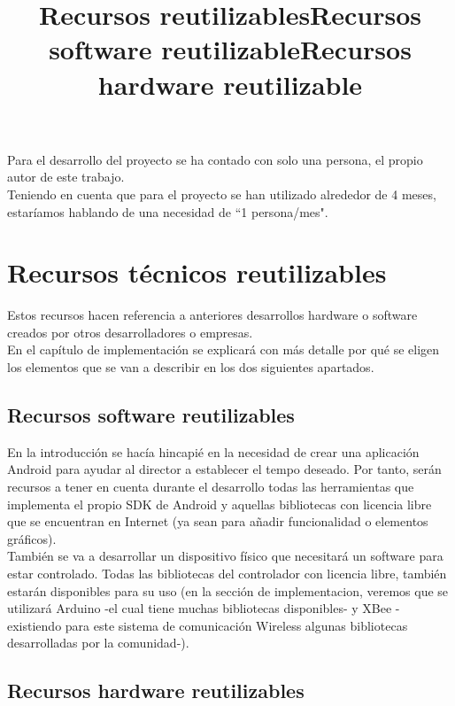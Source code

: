Para el desarrollo del proyecto se ha contado con solo una persona, el propio autor de este trabajo.\\

Teniendo en cuenta que para el proyecto se han utilizado alrededor de 4 meses, estaríamos hablando
de una necesidad de ``1 persona/mes".

\title{Recursos reutilizables}
\section{Recursos técnicos reutilizables}

Estos recursos hacen referencia a anteriores desarrollos hardware o software creados
por otros desarrolladores o empresas.\\

En el capítulo de implementación se explicará con más detalle por qué se
eligen los elementos que se van a describir en los dos siguientes apartados.\\


\subsection{Recursos software reutilizables}
\title{Recursos software reutilizable}

En la introducción se hacía hincapié en la necesidad de crear una aplicación
Android para ayudar al director a establecer el tempo deseado. Por tanto,
serán recursos a tener en cuenta durante el desarrollo todas las herramientas
que implementa el propio SDK de Android y aquellas bibliotecas con licencia
libre que se encuentran en Internet (ya sean para añadir funcionalidad o elementos
gráficos).\\


También se va a desarrollar un dispositivo físico que necesitará un software para estar
controlado. Todas las bibliotecas del controlador con licencia libre, también estarán
disponibles para su uso (en la sección de implementacion, veremos que se utilizará
Arduino -el cual tiene muchas bibliotecas disponibles- y XBee -existiendo para este
sistema de comunicación Wireless algunas bibliotecas desarrolladas por la comunidad-).\\



\subsection{Recursos hardware reutilizables}
\title{Recursos hardware reutilizable}

